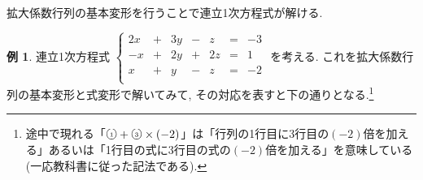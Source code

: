 \documentclass[dvipdfmx,a4paper,11pt]{article}
\newcommand{\maru}[1]{\raise0.2ex\hbox{\textcircled{\tiny{#1}}}}
\theoremstyle{definition}
\newtheorem{exa}[thm]{例}
\begin{document}
拡大係数行列の基本変形を行うことで連立1次方程式が解ける.

\begin{exa}
 連立1次方程式
 $
 \left\{ 
\begin{matrix}
2x&+&3y& -&z &= &-3 \\
-x&+&2y& +&2z &= &1 \\
x&+&y& -&z &= &-2 \\
\end{matrix}
\right.
 $
 を考える. 
 これを拡大係数行列の基本変形と式変形で解いてみて, その対応を表すと下の通りとなる.\footnote{途中で現れる「$\maru{1}+\maru{3}\times(-2)$」は「行列の1行目に3行目の$(-2)$倍を加える」あるいは「1行目の式に3行目の式の$(-2)$倍を加える」を意味している(一応教科書に従った記法である).}

 

\end{exa}
\end{document}
